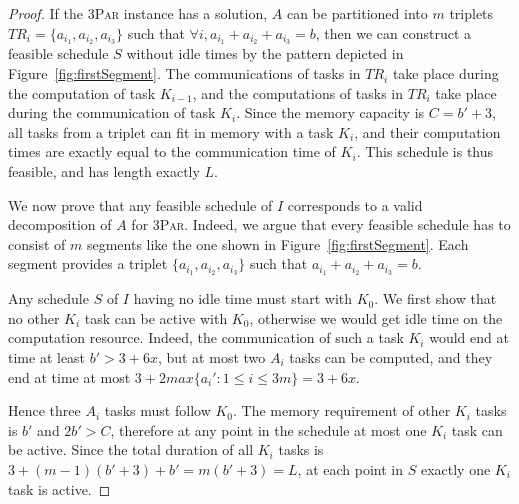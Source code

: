 \documentclass[sigconf]{acmart}
\newcommand{\threepart}{\textsc{3Par}\xspace}
\begin{document}
\begin{proof}
		
		If the \threepart instance has a solution, $A$ can be partitioned into
		$m$ triplets $TR_i = \{a_{i_1}, a_{i_2}, a_{i_3}\}$ such that $\forall
		i, a_{i_1} + a_{i_2} + a_{i_3} = b$, then we can construct a feasible
		schedule $S$ without idle times by the pattern depicted in
		Figure~\ref{fig:firstSegment}. The communications of tasks in $TR_i$ take
		place during the computation of task $K_{i-1}$, and the computations
		of tasks in $TR_i$ take place during the communication of task
		$K_i$. Since the memory capacity is $C=b'+3$, all tasks from a triplet
		can fit in memory with a task $K_i$, and their computation times are exactly
		equal to the communication time of $K_i$. This schedule is thus
		feasible, and has length exactly $L$.
		
		\medskip
		
		We now prove that any feasible schedule of $I$ corresponds to a valid
		decomposition of $A$ for \threepart. Indeed, we argue that every
		feasible schedule has to consist of $m$ segments like the one shown in
		Figure~\ref{fig:firstSegment}. Each segment provides a triplet
		$\{a_{i_1}, a_{i_2}, a_{i_3}\}$ such that $a_{i_1} + a_{i_2} + a_{i_3}
		= b$.
		
		Any schedule $S$ of $I$ having no idle time must start with $K_0$. We
		first show that no other $K_i$ task can be active with $K_0$,
		otherwise we would get idle time on the computation resource. Indeed, the
		communication of such a task $K_i$ would end at time at least $b'>3 +
		6x$, but at most two $A_i$ tasks can be computed, and they end at time
		at most $3+2max\{a_i':1\le i\le 3m\} = 3 + 6x$.
		
		Hence three $A_i$ tasks must follow $K_0$. The memory requirement of
		other $K_i$ tasks is $b'$ and $2b'>C$, therefore at any point in the
		schedule at most one $K_i$ task can be active. Since the total
		duration of all $K_i$ tasks is $3 + (m-1)(b'+3) + b' = m (b'+3)=L$, at
		each point in $S$ exactly one $K_i$ task is active.
		

\end{proof}
\end{document}
